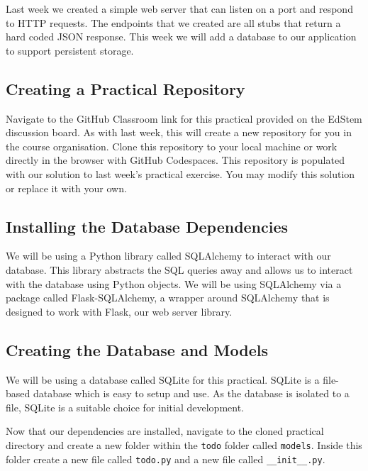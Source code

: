 \documentclass{csse4400}
\begin{document}
Last week we created a simple web server that can listen on a port and respond to HTTP requests.
The endpoints that we created are all stubs that return a hard coded JSON response.
This week we will add a database to our application to support persistent storage.


\subsection{Creating a Practical Repository}
Navigate to the GitHub Classroom link for this practical provided on the EdStem discussion board.
As with last week, this will create a new repository for you in the course organisation.
Clone this repository to your local machine or work directly in the browser with GitHub Codespaces.
This repository is populated with our solution to last week's practical exercise.
You may modify this solution or replace it with your own.


\subsection{Installing the Database Dependencies}

We will be using a Python library called SQLAlchemy to interact with our database.
This library abstracts the SQL queries away and allows us to interact with the database using Python objects.
We will be using SQLAlchemy via a package called Flask-SQLAlchemy,
a wrapper around SQLAlchemy that is designed to work with Flask, our web server library.


\subsection{Creating the Database and Models}

We will be using a database called SQLite for this practical.
SQLite is a file-based database which is easy to setup and use.
As the database is isolated to a file, SQLite is a suitable choice for initial development.

Now that our dependencies are installed,
navigate to the cloned practical directory and create a new folder within the \texttt{todo} folder called \texttt{models}.
Inside this folder create a new file called \texttt{todo.py} and a new file called \texttt{\_\_init\_\_.py}.
\end{document}
